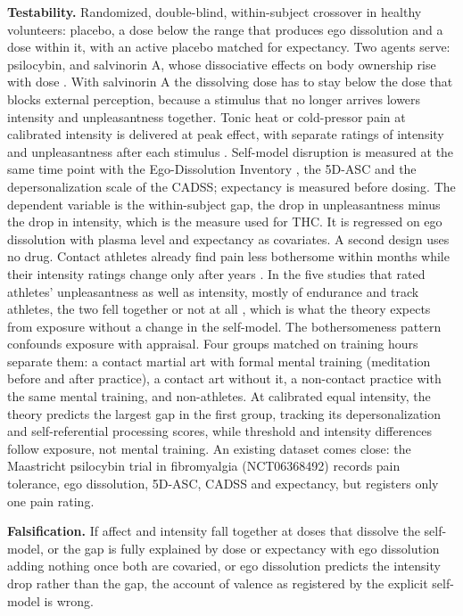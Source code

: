 \documentclass[12pt]{article}
\begin{document}
\textbf{Testability.} Randomized, double-blind, within-subject crossover in healthy volunteers: placebo, a dose below the range that produces ego dissolution and a dose within it, with an active placebo matched for expectancy. Two agents serve: psilocybin, and salvinorin A, whose dissociative effects on body ownership rise with dose \citep{Maqueda2015}. With salvinorin A the dissolving dose has to stay below the dose that blocks external perception, because a stimulus that no longer arrives lowers intensity and unpleasantness together. Tonic heat or cold-pressor pain at calibrated intensity is delivered at peak effect, with separate ratings of intensity and unpleasantness after each stimulus \citep{Rainville1999}. Self-model disruption is measured at the same time point with the Ego-Dissolution Inventory \citep{Nour2016}, the 5D-ASC \citep{Studerus2010} and the depersonalization scale of the CADSS; expectancy is measured before dosing. The dependent variable is the within-subject gap, the drop in unpleasantness minus the drop in intensity, which is the measure \citet{Lee2013} used for THC. It is regressed on ego dissolution with plasma level and expectancy as covariates. A second design uses no drug. Contact athletes already find pain less bothersome within months while their intensity ratings change only after years \citep{Thornton2017,Thornton2019}. In the five studies that rated athletes' unpleasantness as well as intensity, mostly of endurance and track athletes, the two fell together or not at all \citep{Thornton2024}, which is what the theory expects from exposure without a change in the self-model. The bothersomeness pattern confounds exposure with appraisal. Four groups matched on training hours separate them: a contact martial art with formal mental training (meditation before and after practice), a contact art without it, a non-contact practice with the same mental training, and non-athletes. At calibrated equal intensity, the theory predicts the largest gap in the first group, tracking its depersonalization and self-referential processing scores, while threshold and intensity differences follow exposure, not mental training. An existing dataset comes close: the Maastricht psilocybin trial in fibromyalgia (NCT06368492) records pain tolerance, ego dissolution, 5D-ASC, CADSS and expectancy, but registers only one pain rating.

\textbf{Falsification.} If affect and intensity fall together at doses that dissolve the self-model, or the gap is fully explained by dose or expectancy with ego dissolution adding nothing once both are covaried, or ego dissolution predicts the intensity drop rather than the gap, the account of valence as registered by the explicit self-model is wrong.
\end{document}
